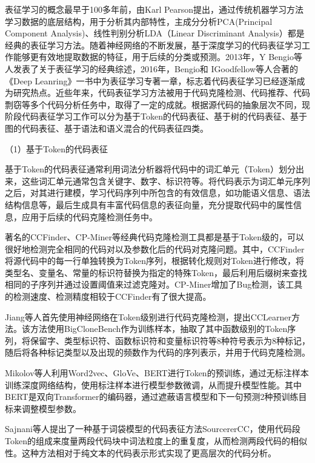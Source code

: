 表征学习的概念最早于100多年前，由Karl Pearson提出，通过传统机器学习方法学习数据的底层结构，用于分析其内部特性\cite{wiki}，主成分分析PCA(Principal Component Analysis)\cite{WOS:000202849800065}、线性判别分析LDA（Linear Discriminant Analysis）\cite{2012THE}都是经典的表征学习方法。随着神经网络的不断发展，基于深度学习的代码表征学习工作能够更有效地提取数据的特征，用于后续的分类或预测。2013年，Y Bengio等人\cite{Bengio2013Representation}发表了关于表征学习的经典综述，2016年，Bengio和 IGoodfellow等人\cite{goodfellow2016deep}合著的《Deep Leanring》一书中为表征学习专著一章，标志着代码表征学习已经逐渐成为研究热点。近些年来，代码表征学习方法被用于代码克隆检测、代码推荐、代码剽窃等多个代码分析任务中，取得了一定的成就。根据源代码的抽象层次不同，现阶段代码表征学习工作可以分为基于Token的代码表征、基于树的代码表征、基于图的代码表征、基于语法和语义混合的代码表征四类。

（1）基于Token的代码表征

基于Token的代码表征通常利用词法分析器将代码中的词汇单元（Token）划分出来，这些词汇单元通常包含关键字、数字、标识符等。将代码表示为词汇单元序列之后，对其进行建模，学习代码序列中所包含的有效信息，如功能语义信息、语法结构信息等，最后生成具有丰富代码信息的表征向量，充分提取代码中的属性信息，应用于后续的代码克隆检测任务中。


著名的CCFinder\cite{1019480}、CP-Miner\cite{1610609}等经典代码克隆检测工具都是基于Token级的，可以很好地检测完全相同的代码对以及参数化后的代码对克隆问题。其中，CCFinder将源代码中的每一行单独转换为Token序列，根据转化规则对Token进行修改，将类型名、变量名、常量的标识符替换为指定的特殊Token，最后利用后缀树来查找相同的子序列并通过设置阈值来过滤克隆对。CP-Miner增加了Bug检测，该工具的检测速度、检测精度相较于CCFinder有了很大提高。

Jiang等人\cite{10.1145/1287624.1287634}首先使用神经网络在Token级别进行代码克隆检测，提出CCLearner方法。该方法使用BigCloneBench\cite{7332459}作为训练样本，抽取了其中函数级别的Token序列，将保留字、类型标识符、函数标识符和变量标识符等8种符号表示为8种标记，随后将各种标记类型以及出现的频数作为代码的序列表示，并用于代码克隆检测。

Mikolov等人\cite{pennington-etal-2014-glove}利用Word2vec、GloVe、BERT进行Token的预训练，通过无标注样本训练深度网络结构，使用标注样本进行模型参数微调，从而提升模型性能。其中BERT\cite{devlin-etal-2019-bert}是双向Transformer的编码器，通过遮蔽语言模型和下一句预测2种预训练目标来调整模型参数。

Sajnani等人\cite{7886988}提出了一种基于词袋模型的代码表征方法SourcererCC，使用代码段Token的组成来度量两段代码块中词法粒度上的重复度，从而检测两段代码的相似性。这种方法相对于纯文本的代码表示形式实现了更高层次的代码分析。

